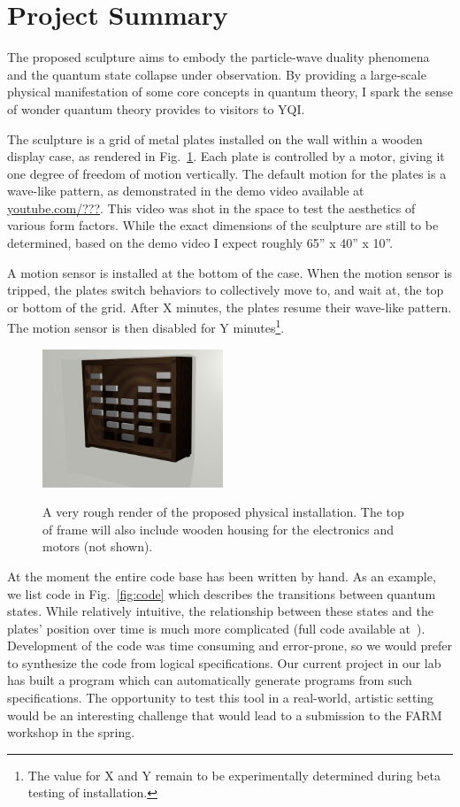 \section{Project Summary}

The proposed sculpture aims to embody the particle-wave duality phenomena and the quantum state collapse under observation.
By providing a large-scale physical manifestation of some core concepts in quantum theory, I spark the sense of wonder quantum theory provides to visitors to YQI.

The sculpture is a grid of metal plates installed on the wall within a wooden display case, as rendered in Fig.~\ref{fig:render}.
Each plate is controlled by a motor, giving it one degree of freedom of motion vertically.
The default motion for the plates is a wave-like pattern, as demonstrated in the demo video available at \url{youtube.com/???}.
This video was shot in the space to test the aesthetics of various form factors.
While the exact dimensions of the sculpture are still to be determined, based on the demo video I expect roughly 65'' x 40'' x 10''.

A motion sensor is installed at the bottom of the case.
When the motion sensor is tripped, the plates switch behaviors to collectively move to, and wait at, the top or bottom of the grid.
After X minutes, the plates resume their wave-like pattern. 
The motion sensor is then disabled for Y minutes\footnote{The value for X and Y remain to be experimentally determined during beta testing of installation.}.

\begin{figure}[h!]
\includegraphics[width=0.48\textwidth]{../Test.png}
\label{fig:render}
\caption{A very rough render of the proposed physical installation. The top of frame will also include wooden housing for the electronics and motors (not shown).}
\end{figure}

At the moment the entire code base has been written by hand. 
As an example, we list code in Fig.~\ref{fig:code} which describes the transitions between quantum states.
While relatively intuitive, the relationship between these states and the plates' position over time is much more complicated (full code available at~\cite{github}).
Development of the code was time consuming and error-prone, so we would prefer to synthesize the code from logical specifications.
Our current project in our lab has built a program which can automatically generate programs from such specifications.
The opportunity to test this tool in a real-world, artistic setting would be an interesting challenge that would lead to a submission to the FARM workshop in the spring.

